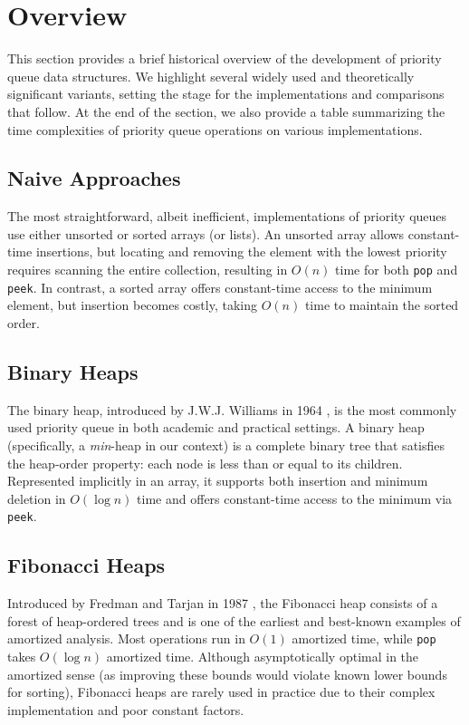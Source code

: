 \section{Overview}

This section provides a brief historical overview of the development of priority queue data structures. We highlight several widely used and theoretically significant variants, setting the stage for the implementations and comparisons that follow. At the end of the section, we also provide a table summarizing the time complexities of priority queue operations on various implementations.

\subsection{Naive Approaches}

The most straightforward, albeit inefficient, implementations of priority queues use either unsorted or sorted arrays (or lists). An unsorted array allows constant-time insertions, but locating and removing the element with the lowest priority requires scanning the entire collection, resulting in \(O(n)\) time for both \texttt{pop} and \texttt{peek}. In contrast, a sorted array offers constant-time access to the minimum element, but insertion becomes costly, taking \(O(n)\) time to maintain the sorted order.

\subsection{Binary Heaps}

The binary heap, introduced by J.W.J. Williams in 1964 \cite{williams1964heapsort}, is the most commonly used priority queue in both academic and practical settings. A binary heap (specifically, a \emph{min}-heap in our context) is a complete binary tree that satisfies the heap-order property: each node is less than or equal to its children. Represented implicitly in an array, it supports both insertion and minimum deletion in \(O(\log n)\) time and offers constant-time access to the minimum via \texttt{peek}.

\subsection{Fibonacci Heaps}

Introduced by Fredman and Tarjan in 1987 \cite{fredman1987fibonacci}, the Fibonacci heap consists of a forest of heap-ordered trees and is one of the earliest and best-known examples of amortized analysis. Most operations run in \(O(1)\) amortized time, while \texttt{pop} takes \(O(\log n)\) amortized time. Although asymptotically optimal in the amortized sense (as improving these bounds would violate known lower bounds for sorting), Fibonacci heaps are rarely used in practice due to their complex implementation and poor constant factors.

